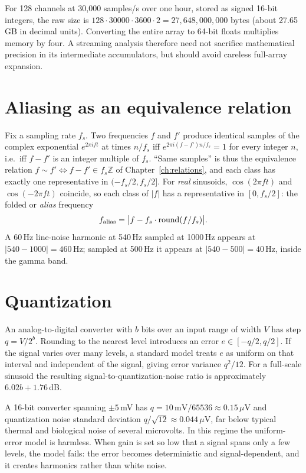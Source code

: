 \begin{workedexample}
For 128 channels at 30,000 samples/s over one hour, stored as signed 16-bit integers, the raw size is $128\cdot30000\cdot3600\cdot2=27{,}648{,}000{,}000$ bytes (about 27.65 GB in decimal units). Converting the entire array to 64-bit floats multiplies memory by four. A streaming analysis therefore need not sacrifice mathematical precision in its intermediate accumulators, but should avoid careless full-array expansion.
\end{workedexample}
\section{Aliasing as an equivalence relation}
Fix a sampling rate $f_s$. Two frequencies $f$ and $f'$ produce identical samples of the complex exponential $e^{2\pi ift}$ at times $n/f_s$ iff $e^{2\pi i(f-f')n/f_s}=1$ for every integer $n$, i.e.\ iff $f-f'$ is an integer multiple of $f_s$. ``Same samples'' is thus the equivalence relation $f\sim f'\iff f-f'\in f_s\mathbb Z$ of Chapter~\ref{ch:relations}, and each class has exactly one representative in $(-f_s/2,f_s/2]$. For \emph{real} sinusoids, $\cos(2\pi ft)$ and $\cos(-2\pi ft)$ coincide, so each class of $|f|$ has a representative in $[0,f_s/2]$: the folded or \emph{alias} frequency
\[
f_{\rm alias}=\bigl|f-f_s\cdot\operatorname{round}(f/f_s)\bigr|.
\]
A 60\,Hz line-noise harmonic at 540\,Hz sampled at 1000\,Hz appears at $|540-1000|=460$\,Hz; sampled at 500\,Hz it appears at $|540-500|=40$\,Hz, inside the gamma band.

\section{Quantization}
An analog-to-digital converter with $b$ bits over an input range of width $V$ has step $q=V/2^b$. Rounding to the nearest level introduces an error $e\in[-q/2,q/2]$. If the signal varies over many levels, a standard model treats $e$ as uniform on that interval and independent of the signal, giving error variance $q^2/12$. For a full-scale sinusoid the resulting signal-to-quantization-noise ratio is approximately $6.02b+1.76$\,dB.

\begin{workedexample}
A 16-bit converter spanning $\pm5$\,mV has $q=10\,\text{mV}/65536\approx0.15\,\mu$V and quantization noise standard deviation $q/\sqrt{12}\approx0.044\,\mu$V, far below typical thermal and biological noise of several microvolts. In this regime the uniform-error model is harmless. When gain is set so low that a signal spans only a few levels, the model fails: the error becomes deterministic and signal-dependent, and it creates harmonics rather than white noise.
\end{workedexample}

